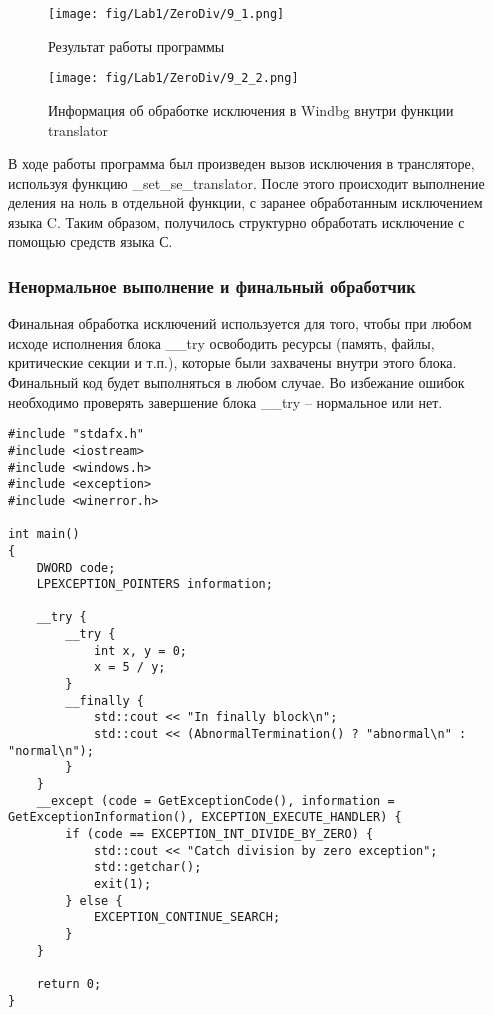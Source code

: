 \begin{figure}[H]
    \begin{center}
        \texttt{[image: fig/Lab1/ZeroDiv/9\_1.png]}
        \caption{Результат работы программы}
        \label{pic:9_1}
    \end{center}
\end{figure}

\begin{figure}[H]
    \begin{center}
        \texttt{[image: fig/Lab1/ZeroDiv/9\_2\_2.png]}
        \caption{Информация об обработке исключения в Windbg внутри функции translator}
        \label{pic:9_2_2}
    \end{center}
\end{figure}
В ходе работы программа был произведен вызов исключения в трансляторе, используя функцию \_set\_se\_translator. После этого происходит выполнение деления на ноль в отдельной функции, с заранее обработанным исключением языка C. Таким образом, получилось структурно обработать исключение с помощью средств языка С.

\subsubsection{Ненормальное выполнение и финальный обработчик}
Финальная обработка исключений используется для того, чтобы при любом исходе исполнения блока \_\_try освободить ресурсы (память, файлы, критические секции и т.п.), которые были захвачены внутри этого блока. Финальный код будет выполняться в любом случае. Во избежание ошибок необходимо проверять завершение блока \_\_try – нормальное или нет.
\begin{lstlisting}[caption=Обработка исключений с использованием блока \_\_finally]
#include "stdafx.h"
#include <iostream>
#include <windows.h>
#include <exception>
#include <winerror.h>

int main()
{
    DWORD code;
    LPEXCEPTION_POINTERS information;

    __try {
        __try {
            int x, y = 0;
            x = 5 / y;
        }
        __finally {
            std::cout << "In finally block\n";
            std::cout << (AbnormalTermination() ? "abnormal\n" : "normal\n");
        }
    }
    __except (code = GetExceptionCode(), information = GetExceptionInformation(), EXCEPTION_EXECUTE_HANDLER) {
        if (code == EXCEPTION_INT_DIVIDE_BY_ZERO) {
            std::cout << "Catch division by zero exception";
            std::getchar();
            exit(1);
        } else {
            EXCEPTION_CONTINUE_SEARCH;
        }
    }

    return 0;
}
\end{lstlisting}

